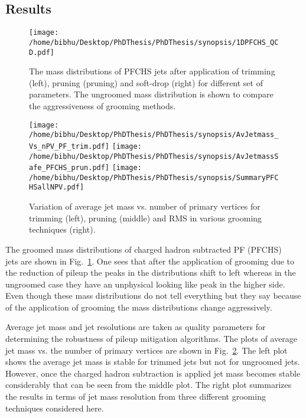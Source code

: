 \subsection{Results}

\begin{figure}[h]
\centering
\texttt{[image: /home/bibhu/Desktop/PhDThesis/PhDThesis/synopsis/1DPFCHS\_QCD.pdf]}

\caption{\label{fig:grooming1D} The mass distributions of PFCHS jets after application of trimming (left), pruning (pruning) and soft-drop (right) for different set of parameters. The ungroomed mass distribution is shown to compare the aggressiveness of grooming methods. }
\end{figure}

\begin{figure}[h]
\centering
\texttt{[image: /home/bibhu/Desktop/PhDThesis/PhDThesis/synopsis/AvJetmass\_Vs\_nPV\_PF\_trim.pdf]}
\texttt{[image: /home/bibhu/Desktop/PhDThesis/PhDThesis/synopsis/AvJetmassSafe\_PFCHS\_prun.pdf]}
\texttt{[image: /home/bibhu/Desktop/PhDThesis/PhDThesis/synopsis/SummaryPFCHSallNPV.pdf]}
\caption{\label{fig:Groom}Variation of average jet mass vs. number of primary vertices for trimming (left), pruning (middle) and RMS in various grooming techniques (right).  }
\end{figure}

The groomed mass distributions of charged hadron subtracted PF (PFCHS) ~\cite{Beaudette:2014cea, JMEPAS} jets are shown in Fig.~\ref{fig:grooming1D}. One sees that after the application of grooming due to the reduction of pileup the peaks in the distributions shift to left whereas in the ungroomed case they have an unphysical looking like peak in the higher side. Even though these mass distributions do not tell everything but they say because of the application of grooming the mass distributions change aggressively.  

Average jet mass and jet resolutions are taken as quality parameters for determining the robustness of pileup mitigation algorithms. The plots of average jet mass vs. the number of primary vertices are shown in Fig.~\ref{fig:Groom}. The left plot shows the average jet mass is stable for trimmed jets but not for ungroomed jets. However, once the charged hadron subtraction is applied jet mass becomes stable considerably that can be seen from the middle plot. The right plot summarizes the results in terms of jet mass resolution from three different grooming techniques considered here.


